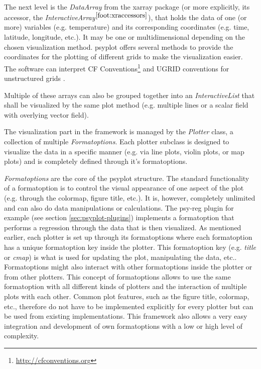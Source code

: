 \begin{refsection}
The next level is the \textit{DataArray} from the xarray package (or more explicitly, its accessor, the \textit{InteractiveArray}$^{\ref{foot:xraccessors}}$), that holds the data of one (or more) variables (e.g. temperature) and its corresponding coordinates (e.g. time, latitude, longitude, etc.). It may be one or multidimensional depending on the chosen visualization method. psyplot offers several methods to provide the coordinates for the plotting of different grids to make the visualization easier. The software can interpret CF Conventions\footnote{\url{http://cfconventions.org}} and UGRID conventions for unstructured grids \citep{JagersStuebeGrossEtAl2018}.

Multiple of these arrays can also be grouped together into an \textit{InteractiveList} that shall be visualized by the same plot method (e.g. multiple lines or a scalar field with overlying vector field).

The visualization part in the framework is managed by the \textit{Plotter} class, a collection of multiple \textit{Formatoptions}. Each plotter subclass is designed to visualize the data in a specific manner (e.g. via line plots, violin plots, or map plots) and is completely defined through it’s formatoptions.

\textit{Formatoptions} are the core of the psyplot structure. The standard functionality of a formatoption is to control the visual appearance of one aspect of the plot (e.g. through the colormap, figure title, etc.). It is, however, completely unlimited and can also do data manipulations or calculations. The psy-reg plugin for example (see section \ref{sec:psyplot-plugins}) implements a formatoption that performs a regression through the data that is then visualized. As mentioned earlier, each plotter is set up through its formatoptions where each formatoption has a unique formatoption key inside the plotter. This formatoption key (e.g. \textit{title} or \textit{cmap}) is what is used for updating the plot, manipulating the data, etc.. Formatoptions might also interact with other formatoptions inside the plotter or from other plotters. This concept of formatoptions allows to use the same formatoption with all different kinds of plotters and the interaction of multiple plots with each other. Common plot features, such as the figure title, colormap, etc., therefore do not have to be implemented explicitly for every plotter but can be used from existing implementations. This framework also allows a very easy integration and development of own formatoptions with a low or high level of complexity.


\end{refsection}
